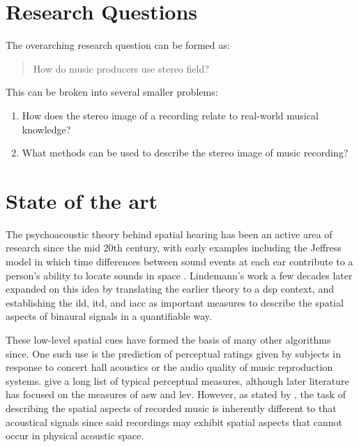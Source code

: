 \documentclass[a4paper]{article}
\begin{document}
\pagebreak

\section{Research Questions}
\label{sec:request_questions}

The overarching research question can be formed as:

\begin{quote}
How do music producers use stereo field?
\end{quote}

\noindent This can be broken into several smaller problems:

\begin{enumerate}
\item How does the stereo image of a recording relate to real-world musical knowledge? \label{rq:usecase}
\item What methods can be used to describe the stereo image of music recording? \label{rq:methods}
\end{enumerate}

\section{State of the art}

The psychoacoustic theory behind spatial hearing has been an active area of research since the mid 20th century, with early examples including the Jeffress model in which time differences between sound events at each ear contribute to a person's ability to locate sounds in space \cite{jeffressPlaceTheorySound1948}. Lindemann's work a few decades later \cite{lindemannEvaluationInterauralSignal1982} expanded on this idea by translating the earlier theory to a \gls{dsp} context, and establishing the \gls{ild}, \gls{itd}, and \gls{iacc} as important measures to describe the spatial aspects of binaural signals in a quantifiable way.

These low-level spatial cues have formed the basis of many other algorithms since. One such use is the prediction of perceptual ratings given by subjects in response to concert hall acoustics or the audio quality of music reproduction systems.  \cite{bergSystematicEvaluationPerceived2003} give a long list of typical perceptual measures, although later literature has focused on the measures of \gls{asw} and \gls{lev}. However, as stated by \citeauthor{sarroffComputationalModelPerceived2011} \cite{sarroffComputationalModelPerceived2011}, the task of describing the spatial aspects of recorded music is inherently different to that acoustical signals since said recordings may exhibit spatial aspects that cannot occur in physical acoustic space.
\end{document}
